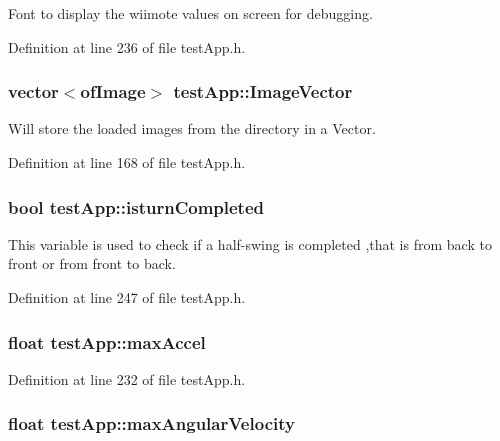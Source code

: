 Font to display the wiimote values on screen for debugging. 



Definition at line 236 of file test\-App.\-h.

\hypertarget{classtest_app_ad4de5d6e6e8f3b8bb7424e62792deb1f}{
\subsubsection[{Image\-Vector}]{\setlength{\rightskip}{0pt plus 5cm}vector$<$of\-Image$>$ test\-App\-::\-Image\-Vector}}\label{classtest_app_ad4de5d6e6e8f3b8bb7424e62792deb1f}


Will store the loaded images from the directory in a Vector. 



Definition at line 168 of file test\-App.\-h.

\hypertarget{classtest_app_a42478a80a90ce9f663c04bcdaea5c5bd}{
\subsubsection[{isturn\-Completed}]{\setlength{\rightskip}{0pt plus 5cm}bool test\-App\-::isturn\-Completed}}\label{classtest_app_a42478a80a90ce9f663c04bcdaea5c5bd}


This variable is used to check if a half-\/swing is completed ,that is from back to front or from front to back. 



Definition at line 247 of file test\-App.\-h.

\hypertarget{classtest_app_a34e834a5e4d359700147a74eece8eed1}{
\subsubsection[{max\-Accel}]{\setlength{\rightskip}{0pt plus 5cm}float test\-App\-::max\-Accel}}\label{classtest_app_a34e834a5e4d359700147a74eece8eed1}


Definition at line 232 of file test\-App.\-h.

\hypertarget{classtest_app_ab9565e8e6dc748ef68e6845f5f94cae9}{
\subsubsection[{max\-Angular\-Velocity}]{\setlength{\rightskip}{0pt plus 5cm}float test\-App\-::max\-Angular\-Velocity}}\label{classtest_app_ab9565e8e6dc748ef68e6845f5f94cae9}


